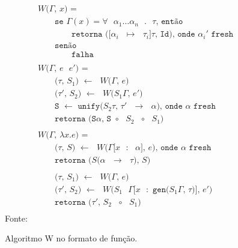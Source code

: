\begin{figure}[ht!]
  \caption{Algoritmo W no formato de função.}
  \centering
  \begin{align*}
     & \texttt{$W$($\Gamma$, $x$) = }                                                                             \\
     & \qquad{}\texttt{se $\Gamma(x) = \forall$ $\alpha_1 \ldots \alpha_n$ $.$ $\tau$, então}                     \\
     & \qquad{}\qquad{}\texttt{retorna ([$\alpha_i$ $\mapsto$ $\tau_i$]$\tau$, Id), onde $\alpha_i'$ fresh}       \\
     & \qquad{}\texttt{senão}                                                                                     \\
     & \qquad{}\qquad{}\texttt{falha}                                                                             \\
    \\
     & \texttt{$W$($\Gamma$, $e$ $e'$) = }                                                                        \\
     & \qquad{}\texttt{($\tau$, $S_1$) $\leftarrow$ $W$($\Gamma$, $e$)}                                           \\
     & \qquad{}\texttt{($\tau'$, $S_2$) $\leftarrow$ $W$($S_1\Gamma$, $e'$)}                                      \\
     & \qquad{}\texttt{S $\leftarrow$ unify($S_2\tau$, $\tau'$ $\to$ $\alpha$), onde $\alpha$ fresh}              \\
     & \qquad{}\texttt{retorna (S$\alpha$, S $\circ$ $S_2$ $\circ$ $S_1$)}                                        \\
    \\
     & \texttt{$W$($\Gamma$, $\lambda x.e$) = }                                                                   \\
     & \qquad{}\texttt{($\tau$, $S$) $\leftarrow$ $W$($\Gamma$[$x$ $:$ $\alpha$], $e$), onde $\alpha$ fresh}      \\
     & \qquad{}\texttt{retorna ($S$($\alpha$ $\to$ $\tau$), $S$)}                                                 \\
    \\
     & \qquad{}\texttt{($\tau$, $S_1$) $\leftarrow$ $W$($\Gamma$, $e$)}                                           \\
     & \qquad{}\texttt{($\tau'$, $S_2$) $\leftarrow$ $W$($S_1$ $\Gamma$[$x$ $:$ gen($S_1\Gamma$, $\tau$)], $e'$)} \\
     & \qquad{}\texttt{retorna ($\tau'$, $S_2$ $\circ$ $S_1$)}                                                    \\
  \end{align*}
  \small{Fonte:~\cite{castro2019certificacao}}\label{algo:w}
\end{figure}

